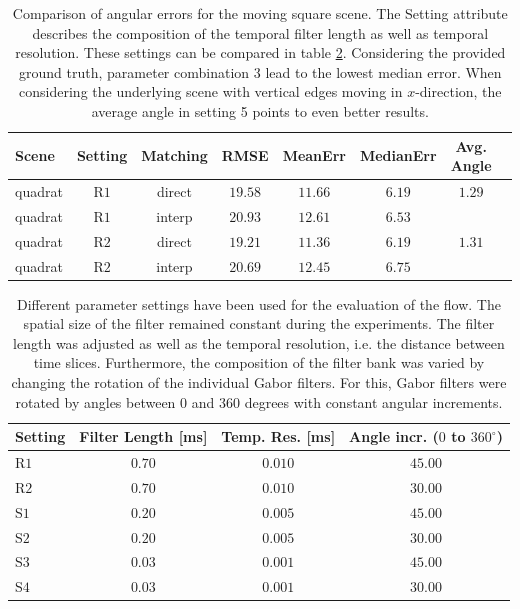 \begin{table}[tb]
	\centering
		\begin{tabular}{lccccccc}
Scene & Setting & Matching & RMSE & MeanErr & MedianErr & Avg. Angle \\
\hline  \hline
quadrat & R$1$ & direct & $19.58$ & $11.66$ & $6.19$ & $1.29$ & \\
quadrat & R$1$ & interp & $20.93$ & $12.61$ & $6.53$ &  & \\
quadrat & R$2$ & direct & $19.21$ & $11.36$ & $6.19$ & $1.31$ & \\
quadrat & R$2$ & interp & $20.69$ & $12.45$ & $6.75$ &  & \\
		\end{tabular}
	\caption[First scene: Comparison of angular errors for different parameters.]{Comparison of angular errors for the moving square scene.
	The Setting attribute describes the composition of the temporal filter length as well as temporal resolution.
	 These settings can be compared in table \ref{tab:parameter_settings}. Considering the provided ground truth, parameter combination 3 lead to the lowest median error. When considering the underlying scene with vertical edges moving in $x$-direction, the average angle in setting 5 points to even better results.}
	\label{tab:error_comparison_square}
\end{table}

\begin{table}[tb]
	\centering
		\begin{tabular}{lccc}
Setting & Filter Length [ms] & Temp. Res. [ms] & Angle incr. ($0$ to $360^\circ$) \\
\hline  \hline
R$1$ & $0.70$ & $0.010$ & $45.00$\\
R$2$ & $0.70$ & $0.010$ & $30.00$\\
S$1$ & $0.20$ & $0.005$ & $45.00$\\
S$2$ & $0.20$ & $0.005$ & $30.00$\\
S$3$ & $0.03$ & $0.001$ & $45.00$\\
S$4$ & $0.03$ & $0.001$ & $30.00$\\
		\end{tabular}
	\caption[Different parameter settings for the evaluations]{Different parameter settings have been used for the evaluation of the flow.
	 The spatial size of the filter remained constant during the experiments.
	 The filter length was adjusted as well as the temporal resolution, i.e. the distance between time slices. 
	 Furthermore, the composition of the filter bank was varied by changing the rotation of the individual Gabor filters. 
	 For this, Gabor filters were rotated by angles between $0$ and $360$ degrees with constant angular increments.}
	\label{tab:parameter_settings}
\end{table}

